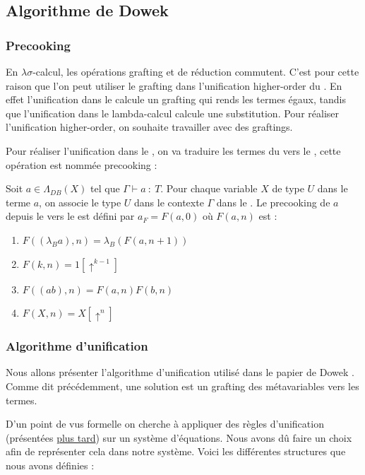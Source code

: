 \subsection{Algorithme de Dowek}

\subsubsection{Precooking}

En $\lambda\sigma$-calcul, les opérations grafting et de réduction commutent. C'est pour cette raison que l'on peut utiliser le grafting dans l'unification higher-order du \lsc{}. En effet l'unification dans le \lsc{} calcule un grafting qui rends les termes égaux, tandis que l'unification dans le lambda-calcul calcule une substitution. Pour réaliser l'unification higher-order, on souhaite travailler avec des graftings.

Pour réaliser l'unification dans le \lc{}, on va traduire les termes du \lc{} vers le \lsc{}, cette opération est nommée precooking :

\begin{defn}
Soit $a \in \Lambda_{DB}(X)$ tel que $\Gamma \vdash a\ :\ T$. Pour chaque variable $X$ de type $U$ dans le terme $a$, on associe le type $U$ dans le contexte $\Gamma$ dans le \lsc{}. Le precooking de $a$ depuis le \lc{} vers le \lsc{} est défini par $a_F = F(a, 0)$ où $F(a, n)$ est :

\begin{enumerate}
    \item $F((\lambda_B a), n) = \lambda_B(F(a, n + 1))$
    \item $F(k, n) = 1[\uparrow^{k-1}]$
    \item $F((a b), n) = F(a, n) F(b, n)$
    \item $F(X, n) = X[\uparrow^n]$
\end{enumerate}

\end{defn}

\subsubsection{Algorithme d'unification}

Nous allons présenter l'algorithme d'unification utilisé dans le papier de Dowek \cite{dowek1995higher}. Comme dit précédemment, une solution est un grafting des métavariables vers les termes.

D'un point de vus formelle on cherche à appliquer des règles d'unification (présentées \hyperref[unificationrules]{plus tard}) sur un système d'équations. Nous avons dû faire un choix afin de représenter cela dans notre système. Voici les différentes structures que nous avons définies :

